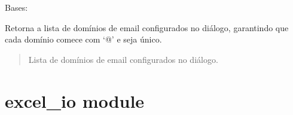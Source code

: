 \documentclass[letterpaper,10pt,english]{sphinxmanual}
\begin{document}
\begin{fulllineitems}
\label{\detokenize{api/dialogs:dialogs.EmailDomainsDialog}}
\pysigstartsignatures
\pysiglinewithargsret
{}
{\sphinxparamcomma {}}
{}
\pysigstopsignatures
\sphinxAtStartPar
Bases: 

\begin{fulllineitems}
\label{\detokenize{api/dialogs:dialogs.EmailDomainsDialog.domains}}
\pysigstartsignatures
\pysiglinewithargsret
{}
{}
{}
\pysigstopsignatures
\sphinxAtStartPar
Retorna a lista de domínios de e\sphinxhyphen{}mail configurados no diálogo, garantindo que cada domínio comece com ‘@’ e seja único.
\begin{quote}\begin{description}
\sphinxAtStartPar
Lista de domínios de e\sphinxhyphen{}mail configurados no diálogo.

\sphinxAtStartPar
{}

\end{description}\end{quote}

\end{fulllineitems}


\end{fulllineitems}


\sphinxstepscope


\section{excel\_io module}
\label{\detokenize{api/excel_io:module-excel_io}}\label{\detokenize{api/excel_io:excel-io-module}}\label{\detokenize{api/excel_io::doc}}
\end{document}
